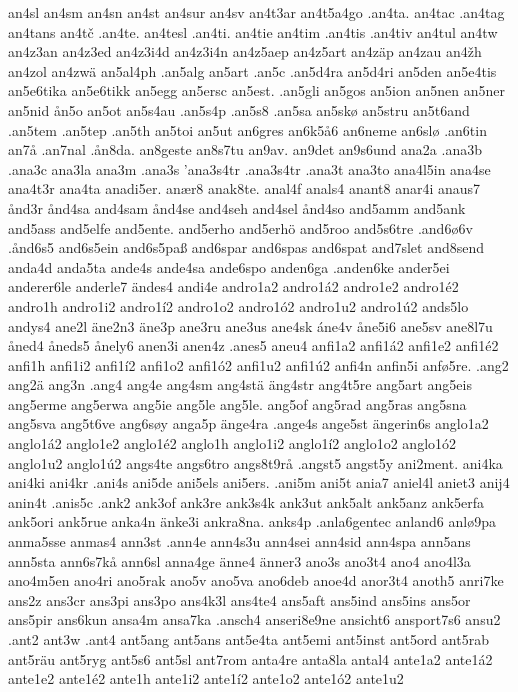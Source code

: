 an4sl
an4sm
an4sn
an4st
an4sur
an4sv
an4t3ar
an4t5a4go
.an4ta.
an4tac
.an4tag
an4tans
an4tč
.an4te.
an4tesl
.an4ti.
an4tie
an4tim
.an4tis
.an4tiv
an4tul
an4tw
an4z3an
an4z3ed
an4z3i4d
an4z3i4n
an4z5aep
an4z5art
an4zäp
an4zau
an4žh
an4zol
an4zwä
an5al4ph
.an5alg
an5art
.an5c
.an5d4ra
an5d4ri
an5den
an5e4tis
an5e6tika
an5e6tikk
an5egg
an5ersc
an5est.
.an5gli
an5gos
an5ion
an5nen
an5ner
an5nid
ån5o
an5ot
an5s4au
.an5s4p
.an5s8
.an5sa
an5skø
an5stru
an5t6and
.an5tem
.an5tep
.an5th
an5toi
an5ut
an6gres
an6k5å6
an6neme
an6slø
.an6tin
an7å
.an7nal
.ån8da.
an8geste
an8s7tu
an9av.
an9det
an9s6und
ana2a
.ana3b
.ana3c
ana3la
ana3m
.ana3s
'ana3s4tr
.ana3s4tr
.ana3t
ana3to
ana4l5in
ana4se
ana4t3r
ana4ta
anadi5er.
anær8
anak8te.
anal4f
anals4
anant8
anar4i
anaus7
ånd3r
ånd4sa
and4sam
ånd4se
and4seh
and4sel
ånd4so
and5amm
and5ank
and5ass
and5elfe
and5ente.
and5erho
and5erhö
and5roo
and5s6tre
.and6ø6v
.ånd6s5
and6s5ein
and6s5paß
and6spar
and6spas
and6spat
and7slet
and8send
anda4d
anda5ta
ande4s
ande4sa
ande6spo
anden6ga
.anden6ke
ander5ei
anderer6le
anderle7
ändes4
andi4e
andro1a2
andro1á2
andro1e2
andro1é2
andro1h
andro1i2
andro1í2
andro1o2
andro1ó2
andro1u2
andro1ú2
ands5lo
andys4
ane2l
äne2n3
äne3p
ane3ru
ane3us
ane4sk
áne4v
åne5i6
ane5sv
ane8l7u
åned4
åneds5
ånely6
anen3i
anen4z
.anes5
aneu4
anfi1a2
anfi1á2
anfi1e2
anfi1é2
anfi1h
anfi1i2
anfi1í2
anfi1o2
anfi1ó2
anfi1u2
anfi1ú2
anfi4n
anfin5i
anfø5re.
.ang2
ang2ä
ang3n
.ang4
ang4e
ang4sm
ang4stä
äng4str
ang4t5re
ang5art
ang5eis
ang5erme
ang5erwa
ang5ie
ang5le
ang5le.
ang5of
ang5rad
ang5ras
ang5sna
ang5sva
ang5t6ve
ang6søy
anga5p
änge4ra
.ange4s
ange5st
ängerin6s
anglo1a2
anglo1á2
anglo1e2
anglo1é2
anglo1h
anglo1i2
anglo1í2
anglo1o2
anglo1ó2
anglo1u2
anglo1ú2
angs4te
angs6tro
angs8t9rå
.angst5
angst5y
ani2ment.
ani4ka
ani4ki
ani4kr
.ani4s
ani5de
ani5els
ani5ers.
.ani5m
ani5t
ania7
aniel4l
aniet3
anij4
anin4t
.anis5c
.ank2
ank3of
ank3re
ank3s4k
ank3ut
ank5alt
ank5anz
ank5erfa
ank5ori
ank5rue
anka4n
änke3i
ankra8na.
anks4p
.anla6gentec
anland6
anlø9pa
anma5sse
anmas4
ann3st
.ann4e
ann4s3u
ann4sei
ann4sid
ann4spa
ann5ans
ann5sta
ann6s7kå
ann6sl
anna4ge
änne4
änner3
ano3s
ano3t4
ano4
ano4l3a
ano4m5en
ano4ri
ano5rak
ano5v
ano5va
ano6deb
anoe4d
anor3t4
anoth5
anri7ke
ans2z
ans3cr
ans3pi
ans3po
ans4k3l
ans4te4
ans5aft
ans5ind
ans5ins
ans5or
ans5pir
ans6kun
ansa4m
ansa7ka
.ansch4
anseri8e9ne
ansicht6
ansport7s6
ansu2
.ant2
ant3w
.ant4
ant5ang
ant5ans
ant5e4ta
ant5emi
ant5inst
ant5ord
ant5rab
ant5räu
ant5ryg
ant5s6
ant5sl
ant7rom
anta4re
anta8la
antal4
ante1a2
ante1á2
ante1e2
ante1é2
ante1h
ante1i2
ante1í2
ante1o2
ante1ó2
ante1u2
